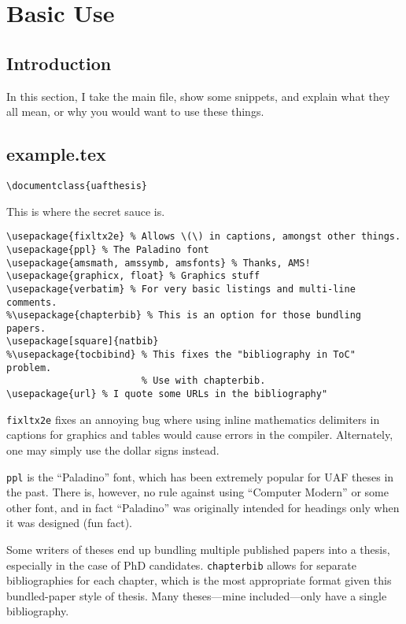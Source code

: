 \chapter{Basic Use}

\section{Introduction}

In this section, I take the main file, show some snippets, and explain what
they all mean, or why you would want to use these things.

\section{example.tex}

\begin{verbatim}
\documentclass{uafthesis}
\end{verbatim}

This is where the secret sauce is.

\begin{verbatim}
\usepackage{fixltx2e} % Allows \(\) in captions, amongst other things.
\usepackage{ppl} % The Paladino font
\usepackage{amsmath, amssymb, amsfonts} % Thanks, AMS!
\usepackage{graphicx, float} % Graphics stuff
\usepackage{verbatim} % For very basic listings and multi-line comments.
%\usepackage{chapterbib} % This is an option for those bundling papers.
\usepackage[square]{natbib}
%\usepackage{tocbibind} % This fixes the "bibliography in ToC" problem.
                        % Use with chapterbib.
\usepackage{url} % I quote some URLs in the bibliography"
\end{verbatim}

\texttt{fixltx2e} fixes an annoying bug where using inline mathematics
delimiters in captions for graphics and tables would cause errors in the
compiler. Alternately, one may simply use the dollar signs instead.

\texttt{ppl} is the ``Paladino'' font, which has been extremely popular for
UAF theses in the past. There is, however, no rule against using ``Computer
Modern'' or some other font, and in fact ``Paladino'' was originally intended
for headings only when it was designed (fun fact).

Some writers of theses end up bundling multiple published papers into a thesis,
especially in the case of PhD candidates. \texttt{chapterbib} allows for
separate bibliographies for each chapter, which is the most appropriate format
given this bundled-paper style of thesis. Many theses---mine included---only
have a single bibliography.

